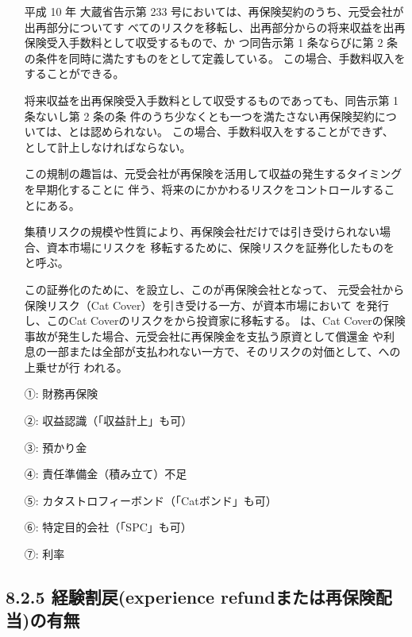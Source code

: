\documentclass[report,gutter=10mm,fore-edge=10mm,uplatex,dvipdfmx]{jlreq}
\begin{document}
\begin{itemize}
\item[] 平成 10 年 大蔵省告示第 233 号においては、再保険契約のうち、元受会社が出再部分についてす
 べてのリスクを移転し、出再部分からの将来収益を出再保険受入手数料として収受するもので、か
 つ同告示第 1 条ならびに第 2 条の条件を同時に満たすものをとして定義している。
 この場合、手数料収入をすることができる。

\item[] 将来収益を出再保険受入手数料として収受するものであっても、同告示第 1 条ないし第 2 条の条
 件のうち少なくとも一つを満たさない再保険契約については、とは認められない。
 この場合、手数料収入をすることができず、
 として計上しなければならない。

\item[] この規制の趣旨は、元受会社が再保険を活用して収益の発生するタイミングを早期化することに
 伴う、将来のにかかわるリスクをコントロールすることにある。

\item[] 集積リスクの規模や性質により、再保険会社だけでは引き受けられない場合、資本市場にリスクを
 移転するために、保険リスクを証券化したものをと呼ぶ。

\item[] この証券化のために、を設立し、このが再保険会社となって、
 元受会社から保険リスク（Cat Cover）を引き受ける一方、が資本市場において
 を発行し、このCat Coverのリスクをから投資家に移転する。
 は、Cat Coverの保険事故が発生した場合、元受会社に再保険金を支払う原資として償還金
 や利息の一部または全部が支払われない一方で、そのリスクの対価として、への上乗せが行
 われる。
\end{itemize}

\answer{}
\begin{itemize}
\item[ ①: ] 財務再保険
\item[ ②: ] 収益認識（「収益計上」も可）
\item[ ③: ] 預かり金
\item[ ④: ] 責任準備金（積み立て）不足
\item[ ⑤: ] カタストロフィーボンド（「Catボンド」も可）
\item[ ⑥: ] 特定目的会社（「SPC」も可）
\item[ ⑦: ] 利率
\end{itemize}
\subsection{8.2.5 経験割戻(experience refundまたは再保険配当)の有無}
\end{document}
